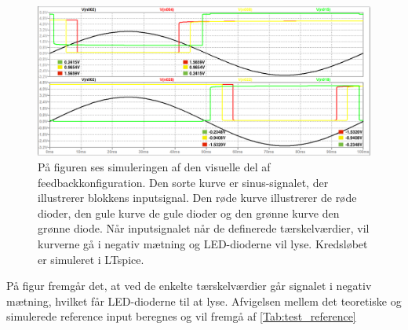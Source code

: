\begin{figure}[H]
	\centering
	\includegraphics[scale=0.3]{figures/cProblemloesning/komparator_visuel_simulering_samlet1.PNG}
	\caption{På figuren ses simuleringen af den visuelle del af feedbackkonfiguration. Den sorte kurve er sinus-signalet, der illustrerer blokkens inputsignal. Den røde kurve illustrerer de røde dioder, den gule kurve de gule dioder og den grønne kurve den grønne diode. Når inputsignalet når de definerede tærskelværdier, vil kurverne gå i negativ mætning og LED-dioderne vil lyse. Kredsløbet er simuleret i LTspice.}
	\label{fig:komparator_visuel_simulering_samlet1}
\end{figure}
På figur  fremgår det, at ved de enkelte tærskelværdier går signalet i negativ mætning, hvilket får LED-dioderne til at lyse. Afvigelsen mellem det teoretiske og simulerede reference input beregnes og vil fremgå af \ref{Tab:test_reference}

